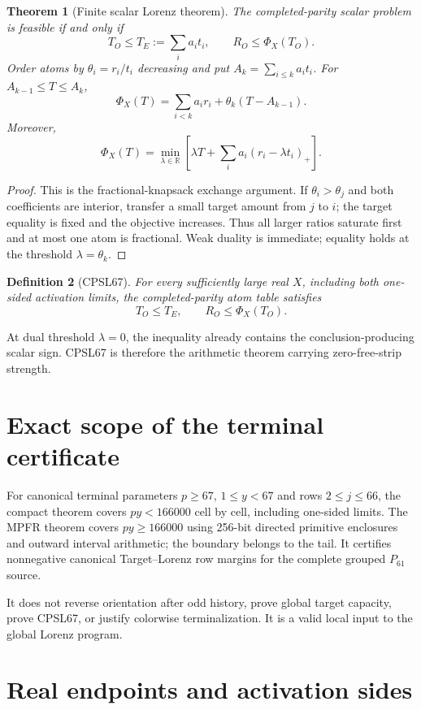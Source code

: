 \documentclass[11pt]{article}
\newtheorem{theorem}{Theorem}[section]
\newtheorem{definition}[theorem]{Definition}
\newcommand{\1}{\mathbf 1}
\newcommand{\R}{\mathbb R}
\newcommand{\PhiX}{\Phi_X}
\begin{document}
\begin{theorem}[Finite scalar Lorenz theorem]\label{thm:lorenz}
The completed-parity scalar problem is feasible if and only if
\[
 T_O\le T_E:=\sum_i a_it_i,\qquad R_O\le\PhiX(T_O).
\]
Order atoms by $\theta_i=r_i/t_i$ decreasing and put $A_k=\sum_{i\le k}a_it_i$. For $A_{k-1}\le T\le A_k$,
\[
 \PhiX(T)=\sum_{i<k}a_ir_i+\theta_k(T-A_{k-1}).
\]
Moreover,
\[
 \PhiX(T)=\min_{\lambda\in\R}\left[\lambda T+\sum_i a_i(r_i-\lambda t_i)_+\right].
\]
\end{theorem}
\begin{proof}
This is the fractional-knapsack exchange argument. If $\theta_i>\theta_j$ and both coefficients are interior, transfer a small target amount from $j$ to $i$; the target equality is fixed and the objective increases. Thus all larger ratios saturate first and at most one atom is fractional. Weak duality is immediate; equality holds at the threshold $\lambda=\theta_k$.
\end{proof}

\begin{definition}[CPSL67]
For every sufficiently large real $X$, including both one-sided activation limits, the completed-parity atom table satisfies
\[
 T_O\le T_E,\qquad R_O\le\PhiX(T_O).
\]
\end{definition}

At dual threshold $\lambda=0$, the inequality already contains the conclusion-producing scalar sign. CPSL67 is therefore the arithmetic theorem carrying zero-free-strip strength.

\section{Exact scope of the terminal certificate}

For canonical terminal parameters $p\ge67$, $1\le y<67$ and rows $2\le j\le66$, the compact theorem covers $py<166000$ cell by cell, including one-sided limits. The MPFR theorem covers $py\ge166000$ using 256-bit directed primitive enclosures and outward interval arithmetic; the boundary belongs to the tail. It certifies nonnegative canonical Target--Lorenz row margins for the complete grouped $P_{61}$ source.

It does not reverse orientation after odd history, prove global target capacity, prove CPSL67, or justify colorwise terminalization. It is a valid local input to the global Lorenz program.

\section{Real endpoints and activation sides}
\end{document}
